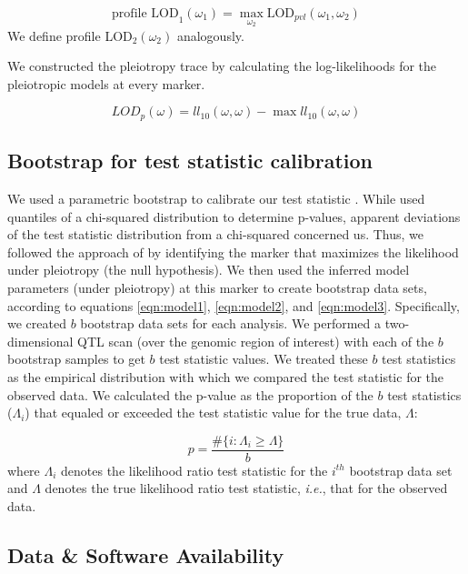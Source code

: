 \documentclass[12pt,twoside, lineno]{gsajnl}
\begin{document}
\begin{equation}
\text{profile LOD}_1(\omega_1) = \max_{\omega_2}\text{LOD}_{pvl}(\omega_1, \omega_2)
\label{eq:profilelod}
\end{equation}
We define profile LOD$_2(\omega_2)$ analogously.

We constructed the pleiotropy trace by calculating the log-likelihoods
for the pleiotropic models at every marker.

\begin{equation}
LOD_{p}(\omega) = ll_{10}(\omega, \omega) - \max ll_{10}(\omega, \omega)
\label{eq:lodp}
\end{equation}




\subsection{Bootstrap for test statistic calibration}

We used a parametric bootstrap to calibrate our test statistic
\citep{efron1979}. While \citet{jiang1995multiple} used quantiles of a
chi-squared distribution to determine p-values, apparent deviations of
the test statistic distribution from a chi-squared concerned us. Thus,
we followed the approach of \citet{tian2016dissection} by identifying
the marker that maximizes the likelihood under pleiotropy (the null
hypothesis). We then used the inferred model parameters (under
pleiotropy) at this marker to create bootstrap data sets, according to
equations \ref{eqn:model1}, \ref{eqn:model2}, and \ref{eqn:model3}.
Specifically, we created $b$ bootstrap data sets for each analysis. We
performed a two-dimensional QTL scan (over the genomic region of
interest) with each of the $b$ bootstrap samples to get $b$ test
statistic values. We treated these $b$ test statistics as the
empirical distribution with which we compared the test statistic for
the observed data. We calculated the p-value as the proportion of the
$b$ test statistics ($\Lambda_i$) that equaled or exceeded the test
statistic value for the true data, $\Lambda$:

\begin{equation}
p = \frac{\# \lbrace i:\Lambda_i \geq \Lambda\rbrace}{b}
\end{equation}
where $\Lambda_{i}$ denotes the likelihood ratio test statistic for
the $i^{th}$ bootstrap data set and $\Lambda$ denotes the true
likelihood ratio test statistic, \textit{i.e.}, that for the observed
data.

\subsection{Data \& Software Availability}
\end{document}
